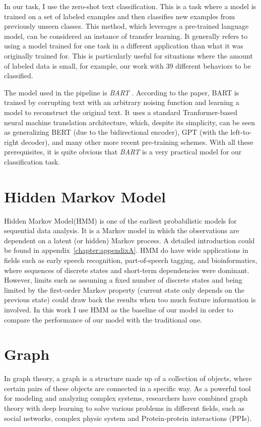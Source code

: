 In our task, I use the zero-shot text classification. This is a task where a model is trained on a set of labeled examples and then classifies new examples from previously unseen classes. This method, which leverages a pre-trained language model, can be considered an instance of transfer learning. It generally refers to using a model trained for one task in a different application than what it was originally trained for. This is particularly useful for situations where the amount of labeled data is small, for example, our work with 39 different behaviors to be classified.

The model used in the pipeline is \textit{BART} \cite{lewis2019bartdenoisingsequencetosequencepretraining}. According to the paper, BART is trained by corrupting text with an arbitrary noising function and learning a model to reconstruct the original text. It uses a standard Tranformer-based neural machine translation architecture, which, despite its simplicity, can be seen as generalizing BERT (due to the bidirectional encoder), GPT (with the left-to-right decoder), and many other more recent pre-training schemes. With all these prerequisites, it is quite obvious that \textit{BART} is a very practical model for our classification task.



\section{Hidden Markov Model}
Hidden Markov Model(HMM) \cite{rabiner1989tutorial,baum1972inequality} is one of the earliest probabilistic models for sequential data analysis. It is a Markov model in which the observations are dependent on a latent (or hidden) Markov process. A detailed introduction could be found in appendix~\ref{chapter:appendixA}. HMM do have wide applications in fields such as early speech recognition, part-of-speech tagging, and bioinformatics, where sequences of discrete states and short-term dependencies were dominant. However, limits such as assuming a fixed number of discrete states and being limited by the first-order Markov property (current state only depends on the previous state) could draw back the results when too much feature information is involved. In this work I use HMM as the baseline of our model in order to compare the performance of our model with the traditional one.
\section{Graph}
\label{sec:graph}
In graph theory, a graph is a structure made up of a collection of objects, where certain pairs of these objects are connected in a specific way\cite{zhou2020graph}. As a powerful tool for modeling and analyzing complex systems, researchers have combined graph theory with deep learning to solve various problems in different fields, such as social networks\cite{wu2020graph}, complex physic system\cite{sanchez2018graph} and Protein-protein interactions (PPIs)\cite{NIPS2017_f5077839}.

